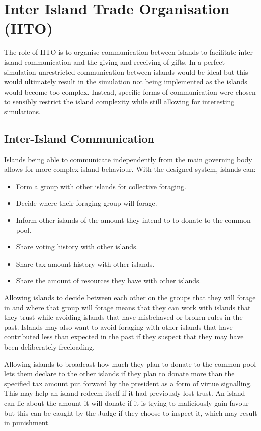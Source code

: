 \chapter{Inter Island Trade Organisation (IITO)}

The role of IITO is to organise communication between islands to facilitate inter-island communication and the giving and receiving of gifts. In a perfect simulation unrestricted communication between islands would be ideal but this would ultimately result in the simulation not being implemented as the islands would become too complex. Instead, specific forms of communication were chosen to sensibly restrict the island complexity while still allowing for interesting simulations.

\section{Inter-Island Communication}  
\label{sec:IITO:inter_island_communication}

Islands being able to communicate independently from the main governing body allows for more complex island behaviour. With the designed system, islands can:

\begin{itemize}
    \item Form a group with other islands for collective foraging.
    \item Decide where their foraging group will forage.
    \item Inform other islands of the amount they intend to to donate to the common pool.
    \item Share voting history with other islands.
    \item Share tax amount history with other islands.
    \item Share the amount of resources they have with other islands.
\end{itemize}

Allowing islands to decide between each other on the groups that they will forage in and where that group will forage means that they can work with islands that they trust while avoiding islands that have misbehaved or broken rules in the past. Islands may also want to avoid foraging with other islands that have contributed less than expected in the past if they suspect that they may have been deliberately freeloading.

Allowing islands to broadcast how much they plan to donate to the common pool lets them declare to the other islands if they plan to donate more than the specified tax amount put forward by the president as a form of virtue signalling. This may help an island redeem itself if it had previously lost trust. An island can lie about the amount it will donate if it is trying to maliciously gain favour but this can be caught by the Judge if they choose to inspect it, which may result in punishment.

